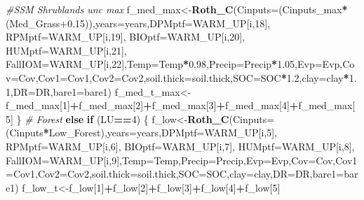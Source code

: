 \documentclass[
  10pt,
  b5paper,
]{book}
\newenvironment{Shaded}{\begin{snugshade}}{\end{snugshade}}
\newcommand{\CommentTok}[1]{\textcolor[rgb]{0.56,0.35,0.01}{\textit{#1}}}
\newcommand{\ControlFlowTok}[1]{\textcolor[rgb]{0.13,0.29,0.53}{\textbf{#1}}}
\newcommand{\DataTypeTok}[1]{\textcolor[rgb]{0.13,0.29,0.53}{#1}}
\newcommand{\DecValTok}[1]{\textcolor[rgb]{0.00,0.00,0.81}{#1}}
\newcommand{\FloatTok}[1]{\textcolor[rgb]{0.00,0.00,0.81}{#1}}
\newcommand{\KeywordTok}[1]{\textcolor[rgb]{0.13,0.29,0.53}{\textbf{#1}}}
\newcommand{\NormalTok}[1]{#1}
\newcommand{\OperatorTok}[1]{\textcolor[rgb]{0.81,0.36,0.00}{\textbf{#1}}}
\begin{document}
\begin{Shaded}
\begin{Highlighting}[]
\CommentTok{#SSM Shrublands unc max}
\NormalTok{f_med_max<-}\KeywordTok{Roth_C}\NormalTok{(}\DataTypeTok{Cinputs=}\NormalTok{(Cinputs_max}\OperatorTok{*}\NormalTok{(Med_Grass}\FloatTok{+0.15}\NormalTok{)),}\DataTypeTok{years=}\NormalTok{years,}\DataTypeTok{DPMptf=}\NormalTok{WARM_UP[i,}\DecValTok{18}\NormalTok{], }\DataTypeTok{RPMptf=}\NormalTok{WARM_UP[i,}\DecValTok{19}\NormalTok{], }\DataTypeTok{BIOptf=}\NormalTok{WARM_UP[i,}\DecValTok{20}\NormalTok{], }\DataTypeTok{HUMptf=}\NormalTok{WARM_UP[i,}\DecValTok{21}\NormalTok{], }\DataTypeTok{FallIOM=}\NormalTok{WARM_UP[i,}\DecValTok{22}\NormalTok{],}\DataTypeTok{Temp=}\NormalTok{Temp}\OperatorTok{*}\FloatTok{0.98}\NormalTok{,}\DataTypeTok{Precip=}\NormalTok{Precip}\OperatorTok{*}\FloatTok{1.05}\NormalTok{,}\DataTypeTok{Evp=}\NormalTok{Evp,}\DataTypeTok{Cov=}\NormalTok{Cov,}\DataTypeTok{Cov1=}\NormalTok{Cov1,}\DataTypeTok{Cov2=}\NormalTok{Cov2,}\DataTypeTok{soil.thick=}\NormalTok{soil.thick,}\DataTypeTok{SOC=}\NormalTok{SOC}\OperatorTok{*}\FloatTok{1.2}\NormalTok{,}\DataTypeTok{clay=}\NormalTok{clay}\OperatorTok{*}\FloatTok{1.1}\NormalTok{,}\DataTypeTok{DR=}\NormalTok{DR,}\DataTypeTok{bare1=}\NormalTok{bare1)}
\NormalTok{f_med_t_max<-f_med_max[}\DecValTok{1}\NormalTok{]}\OperatorTok{+}\NormalTok{f_med_max[}\DecValTok{2}\NormalTok{]}\OperatorTok{+}\NormalTok{f_med_max[}\DecValTok{3}\NormalTok{]}\OperatorTok{+}\NormalTok{f_med_max[}\DecValTok{4}\NormalTok{]}\OperatorTok{+}\NormalTok{f_med_max[}\DecValTok{5}\NormalTok{]}
\NormalTok{\}}
\CommentTok{# Forest }
\ControlFlowTok{else} \ControlFlowTok{if}\NormalTok{ (LU}\OperatorTok{==}\DecValTok{4}\NormalTok{) \{}
\NormalTok{f_low<-}\KeywordTok{Roth_C}\NormalTok{(}\DataTypeTok{Cinputs=}\NormalTok{(Cinputs}\OperatorTok{*}\NormalTok{Low_Forest),}\DataTypeTok{years=}\NormalTok{years,}\DataTypeTok{DPMptf=}\NormalTok{WARM_UP[i,}\DecValTok{5}\NormalTok{], }\DataTypeTok{RPMptf=}\NormalTok{WARM_UP[i,}\DecValTok{6}\NormalTok{], }\DataTypeTok{BIOptf=}\NormalTok{WARM_UP[i,}\DecValTok{7}\NormalTok{], }\DataTypeTok{HUMptf=}\NormalTok{WARM_UP[i,}\DecValTok{8}\NormalTok{], }\DataTypeTok{FallIOM=}\NormalTok{WARM_UP[i,}\DecValTok{9}\NormalTok{],}\DataTypeTok{Temp=}\NormalTok{Temp,}\DataTypeTok{Precip=}\NormalTok{Precip,}\DataTypeTok{Evp=}\NormalTok{Evp,}\DataTypeTok{Cov=}\NormalTok{Cov,}\DataTypeTok{Cov1=}\NormalTok{Cov1,}\DataTypeTok{Cov2=}\NormalTok{Cov2,}\DataTypeTok{soil.thick=}\NormalTok{soil.thick,}\DataTypeTok{SOC=}\NormalTok{SOC,}\DataTypeTok{clay=}\NormalTok{clay,}\DataTypeTok{DR=}\NormalTok{DR,}\DataTypeTok{bare1=}\NormalTok{bare1)}
\NormalTok{f_low_t<-f_low[}\DecValTok{1}\NormalTok{]}\OperatorTok{+}\NormalTok{f_low[}\DecValTok{2}\NormalTok{]}\OperatorTok{+}\NormalTok{f_low[}\DecValTok{3}\NormalTok{]}\OperatorTok{+}\NormalTok{f_low[}\DecValTok{4}\NormalTok{]}\OperatorTok{+}\NormalTok{f_low[}\DecValTok{5}\NormalTok{]}

\end{Highlighting}
\end{Shaded}
\end{document}
